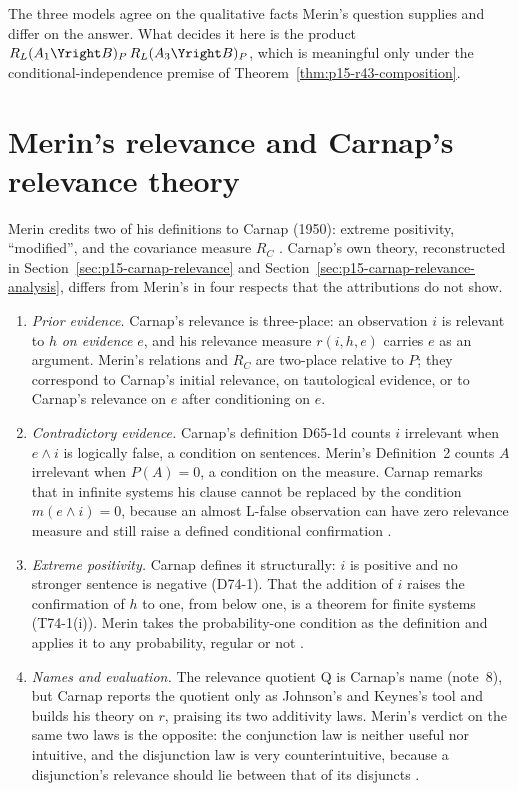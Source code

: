 The three models agree on the qualitative facts Merin's question
supplies and differ on the answer. What decides it here is the product
\(R_L(A_1\Yright B)_P\,R_L(A_3\Yright B)_P\), which is meaningful only
under the conditional-independence premise of
Theorem~\ref{thm:p15-r43-composition}.

\section{Merin's relevance and Carnap's relevance theory}
\label{sec:p15-w02b-p15-024-carnap}

Merin credits two of his definitions to Carnap (1950): extreme
positivity, ``modified'', and the covariance measure \(R_C\)
\cite[pp.~266, 272]{Merin2021Relevance}. Carnap's own theory,
reconstructed in Section~\ref{sec:p15-carnap-relevance} and
Section~\ref{sec:p15-carnap-relevance-analysis}, differs from Merin's
in four respects that the attributions do not show.
\begin{enumerate}
\item \emph{Prior evidence.} Carnap's relevance is three-place: an
  observation \(i\) is relevant to \(h\) \emph{on evidence} \(e\), and
  his relevance measure \(r(i,h,e)\) carries \(e\) as an argument.
  Merin's relations and \(R_C\) are two-place relative to \(P\); they
  correspond to Carnap's initial relevance, on tautological evidence,
  or to Carnap's relevance on \(e\) after conditioning on \(e\).
\item \emph{Contradictory evidence.} Carnap's definition D65-1d counts
  \(i\) irrelevant when \(e\land i\) is logically false, a condition on
  sentences. Merin's Definition~2 counts \(A\) irrelevant when
  \(P(A)=0\), a condition on the measure. Carnap remarks that in
  infinite systems his clause cannot be replaced by the condition
  \(m(e\land i)=0\), because an almost L-false observation can have
  zero relevance measure and still raise a defined conditional
  confirmation \cite[\S65, pp.~347--348]{Carnap1950Probability}
  \cite[p.~266]{Merin2021Relevance}.
\item \emph{Extreme positivity.} Carnap defines it structurally: \(i\)
  is positive and no stronger sentence is negative (D74-1). That the
  addition of \(i\) raises the confirmation of \(h\) to one, from below
  one, is a theorem for finite systems (T74-1(i)). Merin takes the
  probability-one condition as the definition and applies it to any
  probability, regular or not \cite[\S74, pp.~410--412]{Carnap1950Probability}.
\item \emph{Names and evaluation.} The relevance quotient Q is Carnap's
  name (note~8), but Carnap reports the quotient only as Johnson's and
  Keynes's tool and builds his theory on \(r\), praising its two
  additivity laws. Merin's verdict on the same two laws is the
  opposite: the conjunction law is neither useful nor intuitive, and the
  disjunction law is very counterintuitive, because a disjunction's
  relevance should lie between that of its disjuncts
  \cite[\S67, pp.~361--362]{Carnap1950Probability}
  \cite[pp.~272--273]{Merin2021Relevance}.
\end{enumerate}

